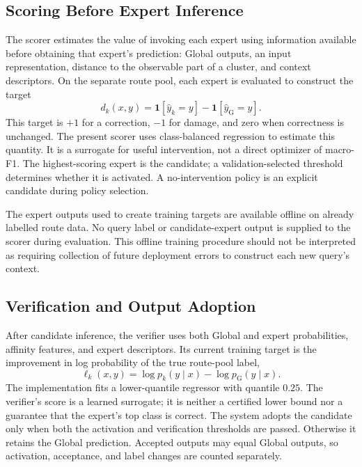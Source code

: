 \documentclass[sigconf,anonymous,pbalance]{acmart}
\newcommand{\globalidx}{\mathrm{G}}
\begin{document}
\subsection{Scoring Before Expert Inference}
The scorer estimates the value of invoking each expert using information available before obtaining that expert's prediction: Global outputs, an input representation, distance to the observable part of a cluster, and context descriptors. On the separate route pool, each expert is evaluated to construct the target
\begin{equation}
 d_k(x,y)=\mathbf{1}[\hat y_k=y]-\mathbf{1}[\hat y_{\globalidx}=y].
 \label{eq:decisiongain}
\end{equation}
This target is $+1$ for a correction, $-1$ for damage, and zero when correctness is unchanged. The present scorer uses class-balanced regression to estimate this quantity. It is a surrogate for useful intervention, not a direct optimizer of macro-F1. The highest-scoring expert is the candidate; a validation-selected threshold determines whether it is activated. A no-intervention policy is an explicit candidate during policy selection.

The expert outputs used to create training targets are available offline on already labelled route data. No query label or candidate-expert output is supplied to the scorer during evaluation. This offline training procedure should not be interpreted as requiring collection of future deployment errors to construct each new query's context.

\subsection{Verification and Output Adoption}
After candidate inference, the verifier uses both Global and expert probabilities, affinity features, and expert descriptors. Its current training target is the improvement in log probability of the true route-pool label,
\begin{equation}
 \ell_k(x,y)=\log p_k(y\mid x)-\log p_{\globalidx}(y\mid x).
\end{equation}
The implementation fits a lower-quantile regressor with quantile $0.25$. The verifier's score is a learned surrogate; it is neither a certified lower bound nor a guarantee that the expert's top class is correct. The system adopts the candidate only when both the activation and verification thresholds are passed. Otherwise it retains the Global prediction. Accepted outputs may equal Global outputs, so activation, acceptance, and label changes are counted separately.
\end{document}
